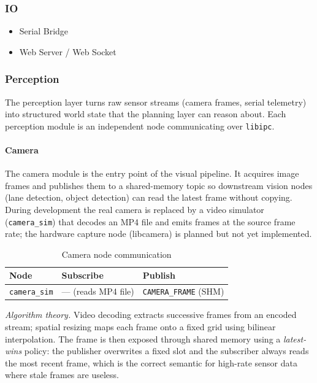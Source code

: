\documentclass[12pt,a4paper]{article}
\begin{document}
\subsubsection{IO}

\begin{itemize}
    \item Serial Bridge
    \item Web Server / Web Socket
\end{itemize}

\subsubsection{Perception}

The perception layer turns raw sensor streams (camera frames, serial telemetry)
into structured world state that the planning layer can reason about.
Each perception module is an independent node communicating over \texttt{libipc}.

\paragraph{Camera}

The camera module is the entry point of the visual pipeline. It acquires image
frames and publishes them to a shared-memory topic so downstream vision nodes
(lane detection, object detection) can read the latest frame without copying.
During development the real camera is replaced by a video simulator
(\texttt{camera\_sim}) that decodes an MP4 file and emits frames at the
source frame rate; the hardware capture node (libcamera) is planned but not yet
implemented.

\begin{table}[H]
\centering
\begin{tabular}{lll}
\hline
\textbf{Node} & \textbf{Subscribe} & \textbf{Publish} \\
\hline
\texttt{camera\_sim} & --- (reads MP4 file) & \texttt{CAMERA\_FRAME} (SHM) \\
\hline
\end{tabular}
\caption{Camera node communication}
\end{table}

\textit{Algorithm theory.}
Video decoding extracts successive frames from an encoded stream; spatial
resizing maps each frame onto a fixed grid using bilinear interpolation. The
frame is then exposed through shared memory using a \emph{latest-wins} policy:
the publisher overwrites a fixed slot and the subscriber always reads the most
recent frame, which is the correct semantic for high-rate sensor data where
stale frames are useless.
\end{document}
